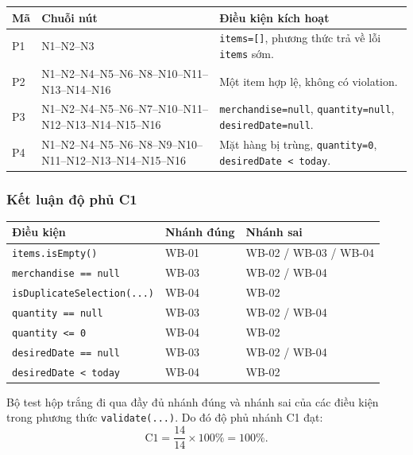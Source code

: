 \documentclass[12pt,a4paper]{article}
\newcommand{\code}[1]{\texttt{#1}}
\begin{document}
\begin{longtable}{
    >{\raggedright\arraybackslash}p{}
    >{\raggedright\arraybackslash}p{}
    >{\raggedright\arraybackslash}p{}
}
\toprule
\textbf{Mã} & \textbf{Chuỗi nút} & \textbf{Điều kiện kích hoạt}\\
\midrule
P1
&
N1--N2--N3
&
\code{items=[]}, phương thức trả về lỗi \code{items} sớm.
\\

P2
&
N1--N2--N4--N5--N6--N8--N10--N11--N13--N14--N16
&
Một item hợp lệ, không có violation.
\\

P3
&
N1--N2--N4--N5--N6--N7--N10--N11--N12--N13--N14--N15--N16
&
\code{merchandise=null}, \code{quantity=null}, \code{desiredDate=null}.
\\

P4
&
N1--N2--N4--N5--N6--N8--N9--N10--N11--N12--N13--N14--N15--N16
&
Mặt hàng bị trùng, \code{quantity=0}, \code{desiredDate < today}.
\\
\bottomrule
\end{longtable}

\subsubsection*{Kết luận độ phủ C1}

\begin{longtable}{p{}p{}p{}}
\toprule
\textbf{Điều kiện} & \textbf{Nhánh đúng} & \textbf{Nhánh sai}\\
\midrule
\code{items.isEmpty()} & WB-01 & WB-02 / WB-03 / WB-04\\
\code{merchandise == null} & WB-03 & WB-02 / WB-04\\
\code{isDuplicateSelection(...)} & WB-04 & WB-02\\
\code{quantity == null} & WB-03 & WB-02 / WB-04\\
\code{quantity <= 0} & WB-04 & WB-02\\
\code{desiredDate == null} & WB-03 & WB-02 / WB-04\\
\code{desiredDate < today} & WB-04 & WB-02\\
\bottomrule
\end{longtable}

Bộ test hộp trắng đi qua đầy đủ nhánh đúng và nhánh sai của các điều kiện trong phương thức \code{validate(...)}. Do đó độ phủ nhánh C1 đạt:
\[
\text{C1} = \frac{14}{14} \times 100\% = 100\%.
\]
\end{document}
